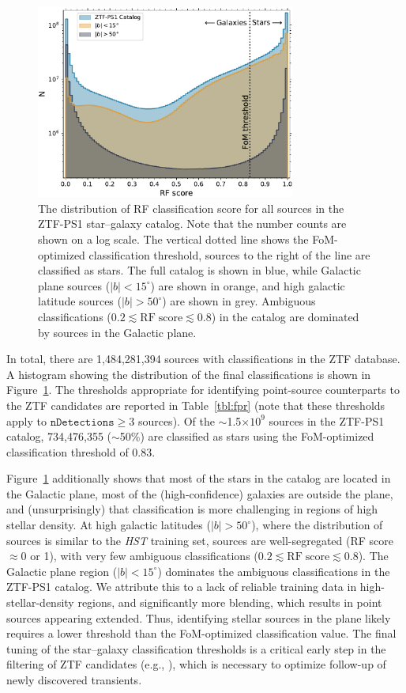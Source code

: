 \documentclass[twocolumn, dvipdfmx]{aastex62}
\begin{document}
\begin{figure}[htb]
 \centering
  \includegraphics[width=3.35in]{./Figures/ZTF_PS1_cat_hist.pdf}
  \caption{ The distribution of RF classification score for all sources 
 in the ZTF-PS1 star--galaxy
  catalog. Note that the number counts are shown on a log scale. The vertical dotted line shows the FoM-optimized classification threshold, sources to the right of the line are classified as stars. The full catalog is shown in blue, while Galactic plane sources ($|b| <
15^{\circ}$) are shown in orange, and high galactic latitude sources ($|b| > 50^{\circ}$) are shown in grey. Ambiguous classifications ($0.2 \lesssim
\mathrm{RF\;score} \lesssim 0.8$) in the catalog are dominated by sources in the Galactic plane.}
  \label{fig:ztf_hist}
\end{figure}

In total, there are 1,484,281,394 sources with classifications in the ZTF
database. A histogram showing the distribution of the final classifications
is shown in Figure~\ref{fig:ztf_hist}. The thresholds appropriate for
identifying point-source counterparts to the ZTF candidates are reported in
Table~\ref{tbl:fpr} (note that these thresholds apply to
$\mathtt{nDetections} \ge 3$ sources). Of the $\sim$1.5$\times 10^{9}$
sources in the ZTF-PS1 catalog, 734,476,355 ($\sim$50\%) are classified as
stars using the FoM-optimized classification threshold of 0.83.

Figure~\ref{fig:ztf_hist} additionally shows that most of the stars in the
catalog are located in the Galactic plane, most of the (high-confidence)
galaxies are outside the plane, and (unsurprisingly) that classification is
more challenging in regions of high stellar density. At high galactic
latitudes ($|b| > 50^{\circ}$), where the distribution of sources is similar
to the \textit{HST} training set, sources are well-segregated (RF score
$\approx$0 or 1), with very few ambiguous classifications ($0.2 \lesssim
\mathrm{RF\;score} \lesssim 0.8$). The Galactic plane region ($|b| <
15^{\circ}$) dominates the ambiguous classifications in the ZTF-PS1 catalog.
We attribute this to a lack of reliable training data in
high-stellar-density regions, and significantly more blending, which results
in point sources appearing extended. Thus, identifying stellar sources in
the plane likely requires a lower threshold than the FoM-optimized
classification value. The final tuning of the star--galaxy classification
thresholds is a critical early step in the filtering of ZTF candidates
(e.g., \citealt{Kasliwal:18:ZTF}), which is necessary to optimize follow-up of newly
discovered transients.
\end{document}
